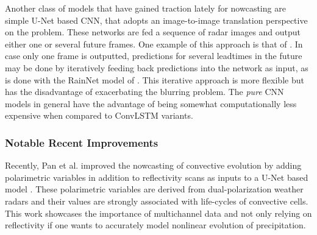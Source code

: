 Another class of models that have gained traction lately for nowcasting are simple U-Net based CNN, that adopts an image-to-image translation perspective on the problem. These networks are fed a sequence of radar images and output either one or several future frames. One example of this approach is  that of \citet{agrawal_machine_2019}. In case only one frame is outputted, predictions for several leadtimes in the future may be done by iteratively feeding back predictions into the network as input, as is done with the RainNet model of \citet{ayzel_rainnet_nodate}. This iterative approach is more flexible but has the disadvantage of exacerbating the blurring problem. The \textit{pure} CNN models in general have the advantage of being somewhat computationally less expensive when compared to ConvLSTM variants. 

\subsubsection*{Notable Recent Improvements}

Recently, Pan et al. improved the nowcasting of convective evolution by adding  polarimetric variables in addition to reflectivity scans as inputs to a U-Net based model \cite{pan_improving_2021}. These polarimetric variables are derived from dual-polarization weather radars and their values are strongly associated with life-cycles of convective cells. This work showcases the importance of multichannel data and not only relying on reflectivity if one wants to accurately model nonlinear evolution of precipitation.

